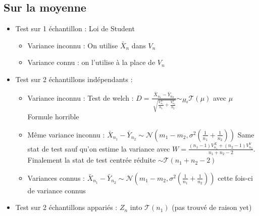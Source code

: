 \documentclass{article}
\theoremstyle{plain}%
\theoremstyle{definition}
\theoremstyle{remark}
\begin{document}
\subsection{Sur la moyenne}
\begin{itemize}
    \item Test sur 1 échantillon : Loi de Student \begin{itemize}
        \item Variance inconnu : On utilise $ \bar{X}_n $ dans $ V_n $ 
        \item Variance connu : on l'utilise à la place de $ V_n $ 
    \end{itemize}
    
    \item Test sur 2 échantillons indépendants : \begin{itemize}
        \item Variance inconnu : Test de welch : $ D = \frac{\bar{X}_{n_1} - \bar{Y}_{n_2}}{\sqrt[]{\frac{V_{n_1}^X}{n_1} + \frac{V_{n_2}^Y}{n_2}}} \sim_{H_0} \mathcal{T}(\mu ) $ avec $ \mu $ Formule horrible  
        \item Même variance inconnu : $ \bar{X}_{n_1} - \bar{Y}_{n_2} \sim \mathcal{N}(m_1 - m_2, \sigma ^2 (\frac{1}{n_1} + \frac{1}{n_2}))$ Same stat de test sauf qu'on estime la variance avec $ W = \frac{(n_1 - 1) V_{n_1}^X + (n_2 - 1) V_{n_2}^Y}{n_1 + n_2 - 2}$. Finalement la stat de test centrée réduite $ \sim \mathcal{T}(n_1 + n_2 - 2) $ 
        \item Variances connus :  $ \bar{X}_{n_1} - \bar{Y}_{n_2} \sim \mathcal{N}(m_1 - m_2, \sigma ^2 (\frac{1}{n_1} + \frac{1}{n_2}))$ cette fois-ci de variance connus
    \end{itemize}

    \item Test sur 2 échantillons appariés : $ Z_n $ into $ \mathcal{T}(n_1) $  (pas trouvé de raison yet)
\end{itemize}
\end{document}
